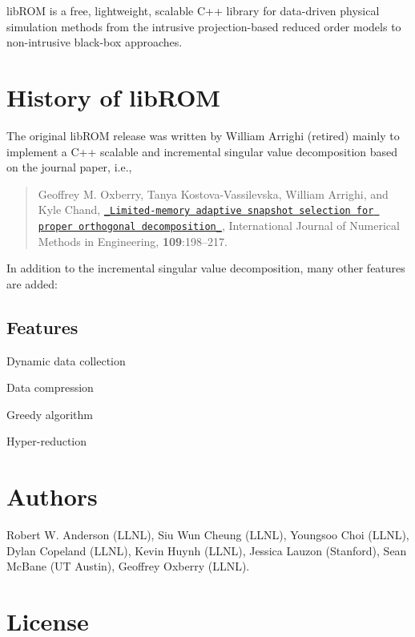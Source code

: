 lib\-R\-O\-M is a free, lightweight, scalable C++ library for data-\/driven physical simulation methods from the intrusive projection-\/based reduced order models to non-\/intrusive black-\/box approaches.

\section*{History of lib\-R\-O\-M}

The original lib\-R\-O\-M release was written by William Arrighi (retired) mainly to implement a C++ scalable and incremental singular value decomposition based on the journal paper, i.\-e.,

\begin{quotation}
Geoffrey M. Oxberry, Tanya Kostova-\/\-Vassilevska, William Arrighi, and Kyle Chand, \href{https://onlinelibrary.wiley.com/doi/full/10.1002/nme.5283}{\tt \-\_\-\-Limited-\/memory adaptive snapshot selection for proper orthogonal decomposition\-\_\-}, International Journal of Numerical Methods in Engineering, {\bfseries 109}\-:198--217.

\end{quotation}


In addition to the incremental singular value decomposition, many other features are added\-:

\subsection*{Features}


\begin{DoxyItemize}
\item Dynamic data collection
\item Data compression
\item Greedy algorithm
\item Hyper-\/reduction
\end{DoxyItemize}

\section*{Authors}

Robert W. Anderson (L\-L\-N\-L), Siu Wun Cheung (L\-L\-N\-L), Youngsoo Choi (L\-L\-N\-L), Dylan Copeland (L\-L\-N\-L), Kevin Huynh (L\-L\-N\-L), Jessica Lauzon (Stanford), Sean Mc\-Bane (U\-T Austin), Geoffrey Oxberry (L\-L\-N\-L).

\section*{License}

